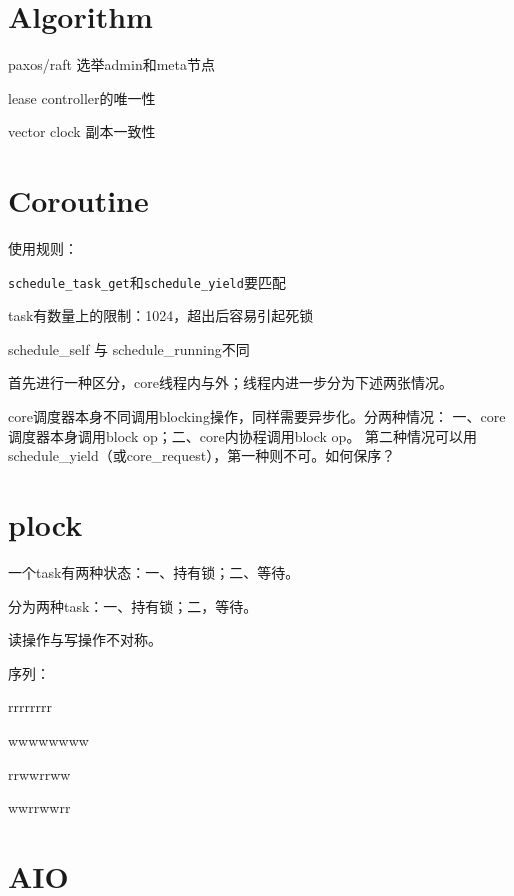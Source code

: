 \section{Algorithm}

\begin{compactitem}
    \item paxos/raft 选举admin和meta节点
    \item lease controller的唯一性
    \item vector clock 副本一致性
\end{compactitem}

\section{Coroutine}

使用规则：
\begin{compactitem}
    \item \verb|schedule_task_get|和\verb|schedule_yield|要匹配
    \item task有数量上的限制：1024，超出后容易引起死锁
    \item schedule\_self 与 schedule\_running不同
\end{compactitem}

首先进行一种区分，core线程内与外；线程内进一步分为下述两张情况。

core调度器本身不同调用blocking操作，同样需要异步化。分两种情况：
一、core调度器本身调用block op；二、core内协程调用block op。
第二种情况可以用schedule\_yield（或core\_request），第一种则不可。如何保序？

\section{plock}

一个task有两种状态：一、持有锁；二、等待。

分为两种task：一、持有锁；二，等待。

读操作与写操作不对称。

序列：
\begin{enumbox}
\item rrrrrrrr
\item wwwwwwww
\item rrwwrrww
\item wwrrwwrr
\end{enumbox}

\section{AIO}

